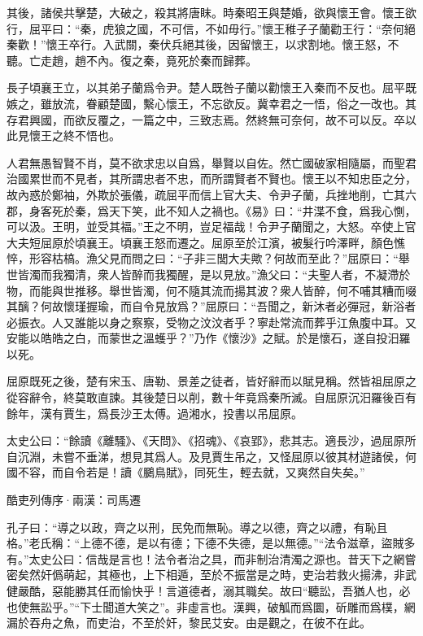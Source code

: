 \documentclass[12pt,a4paper]{ctexbook}
\begin{document}
其後，諸侯共擊楚，大破之，殺其將唐眜。時秦昭王與楚婚，欲與懷王會。懷王欲行，屈平曰：“秦，虎狼之國，不可信，不如毋行。”懷王稚子子蘭勸王行：“奈何絕秦歡！”懷王卒行。入武關，秦伏兵絕其後，因留懷王，以求割地。懷王怒，不聽。亡走趙，趙不內。復之秦，竟死於秦而歸葬。\par
長子頃襄王立，以其弟子蘭爲令尹。楚人既咎子蘭以勸懷王入秦而不反也。屈平既嫉之，雖放流，眷顧楚國，繫心懷王，不忘欲反。冀幸君之一悟，俗之一改也。其存君興國，而欲反覆之，一篇之中，三致志焉。然終無可奈何，故不可以反。卒以此見懷王之終不悟也。\par
人君無愚智賢不肖，莫不欲求忠以自爲，舉賢以自佐。然亡國破家相隨屬，而聖君治國累世而不見者，其所謂忠者不忠，而所謂賢者不賢也。懷王以不知忠臣之分，故內惑於鄭袖，外欺於張儀，疏屈平而信上官大夫、令尹子蘭，兵挫地削，亡其六郡，身客死於秦，爲天下笑，此不知人之禍也。《易》曰：“井渫不食，爲我心惻，可以汲。王明，並受其福。”王之不明，豈足福哉！令尹子蘭聞之，大怒。卒使上官大夫短屈原於頃襄王。頃襄王怒而遷之。屈原至於江濱，被髮行吟澤畔，顏色憔悴，形容枯槁。漁父見而問之曰：“子非三閭大夫歟？何故而至此？”屈原曰：“舉世皆濁而我獨清，衆人皆醉而我獨醒，是以見放。”漁父曰：“夫聖人者，不凝滯於物，而能與世推移。舉世皆濁，何不隨其流而揚其波？衆人皆醉，何不哺其糟而啜其醨？何故懷瑾握瑜，而自令見放爲？”屈原曰：“吾聞之，新沐者必彈冠，新浴者必振衣。人又誰能以身之察察，受物之汶汶者乎？寧赴常流而葬乎江魚腹中耳。又安能以皓皓之白，而蒙世之溫蠖乎？”乃作《懷沙》之賦。於是懷石，遂自投汨羅以死。\par
屈原既死之後，楚有宋玉、唐勒、景差之徒者，皆好辭而以賦見稱。然皆祖屈原之從容辭令，終莫敢直諫。其後楚日以削，數十年竟爲秦所滅。自屈原沉汨羅後百有餘年，漢有賈生，爲長沙王太傅。過湘水，投書以吊屈原。\par
太史公曰：“餘讀《離騷》、《天問》、《招魂》、《哀郢》，悲其志。適長沙，過屈原所自沉淵，未嘗不垂涕，想見其爲人。及見賈生吊之，又怪屈原以彼其材遊諸侯，何國不容，而自令若是！讀《鵩鳥賦》，同死生，輕去就，又爽然自失矣。”\par
酷吏列傳序·兩漢：司馬遷 \par
孔子曰：“導之以政，齊之以刑，民免而無恥。導之以德，齊之以禮，有恥且格。”老氏稱：“上德不德，是以有德；下德不失德，是以無德。”“法令滋章，盜賊多有。”太史公曰：信哉是言也！法令者治之具，而非制治清濁之源也。昔天下之網嘗密矣然奸僞萌起，其極也，上下相遁，至於不振當是之時，吏治若救火揚沸，非武健嚴酷，惡能勝其任而愉快乎！言道德者，溺其職矣。故曰“聽訟，吾猶人也，必也使無訟乎。”“下士聞道大笑之”。非虛言也。漢興，破觚而爲圜，斫雕而爲樸，網漏於吞舟之魚，而吏治，不至於奸，黎民艾安。由是觀之，在彼不在此。\par
\end{document}
